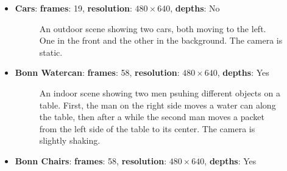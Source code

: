 \begin{itemize}
\item \textbf{Cars}: \textbf{frames}: 19, \textbf{resolution}: $480 \times 640$, \textbf{depths}: No 
\begin{figure}[H]
\begin{center}
\end{center}
\caption[Dataset Bonn Cars]{An outdoor scene showing two cars, both moving to the left. One in the front and the other in the background. The camera is static.}
\label{fig:eval_datasets_cars}
\end{figure}
\item \textbf{Bonn Watercan}: \textbf{frames}: 58, \textbf{resolution}: $480 \times 640$, \textbf{depths}: Yes
\begin{figure}[H]
\begin{center}
\end{center}
\caption[Dataset Bonn Watercan]{An indoor scene showing two men psuhing different objects on a table. First, the man on the right side moves a water can along the table, then after a while the second man moves a packet from the left side of the table to its center. The camera is slightly shaking.}
\label{fig:eval_datasets_bonn_watercan}
\end{figure}
\item \textbf{Bonn Chairs}: \textbf{frames}: 58, \textbf{resolution}: $480 \times 640$, \textbf{depths}: Yes
\begin{figure}[H]
\begin{center}
\subfigure[Frame 45]{
}
\end{center}
\end{figure}
\end{itemize}
